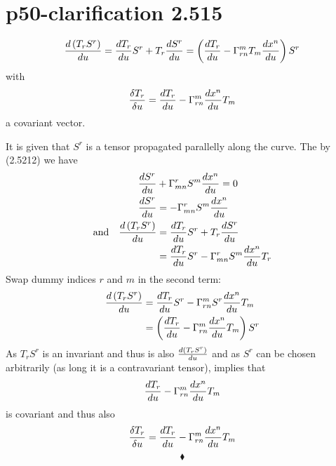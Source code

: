 \section{p50-clarification 2.515 }
\begin{tcolorbox}
$$\dv{\left(T_rS^r\right)}{u} = \dv{T_r}{u}S^r + T_r\dv{S^r}{u} = \left(\dv{T_r}{u} - \Gamma^m_{rn}T_m\dv{x^n}{u}\right)S^r$$ with $$\frac{\delta T_r}{\delta u} = \dv{T_r}{u} -\Gamma^m_{rn}\dv{x^n}{u} T_m$$ a covariant vector.
\end{tcolorbox}
It is given that $S^r$ is a tensor propagated parallelly along the curve. The by (2.5212) we have
\begin{align}
\dv{S^r}{u} &+ \Gamma^r_{mn}S^m\dv{x^n}{u}= 0\\
\dv{S^r}{u} &= - \Gamma^r_{mn}S^m\dv{x^n}{u}\\
\text{and}\quad \dv{\left(T_rS^r\right)}{u} &= \dv{T_r}{u}S^r + T_r\dv{S^r}{u} \\
\ &= \dv{T_r}{u}S^r -\Gamma^r_{mn}S^m\dv{x^n}{u} T_r\\
\end{align}
Swap dummy indices $r$ and $m$ in the second term:
\begin{align}
\dv{\left(T_rS^r\right)}{u} &= \dv{T_r}{u}S^r -\Gamma^m_{rn}S^r\dv{x^n}{u} T_m\\
\ &= \left(\dv{T_r}{u} -\Gamma^m_{rn}\dv{x^n}{u} T_m\right)S^r\\
\end{align}
As $T_rS^r$ is an invariant and thus is also $\dv{\left(T_rS^r\right)}{u}$ and as $S^r$ can be chosen arbitrarily (as long it is a contravariant tensor), implies that $$\dv{T_r}{u} -\Gamma^m_{rn}\dv{x^n}{u} T_m$$ is covariant and thus also $$\frac{\delta T_r}{\delta u} = \dv{T_r}{u} -\Gamma^m_{rn}\dv{x^n}{u} T_m$$
$$\blacklozenge$$
\newpage

